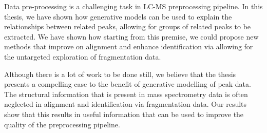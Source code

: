 Data pre-processing is a challenging task in LC-MS preprocessing pipeline. In this thesis, we have shown how generative models can be used to explain the relationships between related peaks, allowing for groups of related peaks to be extracted. We have shown how starting from this premise, we could propose new methods that improve on alignment and enhance identification via allowing for the untargeted exploration of fragmentation data. 

Although there is a lot of work to be done still, we believe that the thesis presents a compelling case to the benefit of generative modelling of peak data. The structural information that is present in mass spectrometry data is often neglected in alignment and identification via fragmentation data. Our results show that this results in useful information that can be used to improve the quality of the preprocessing pipeline.